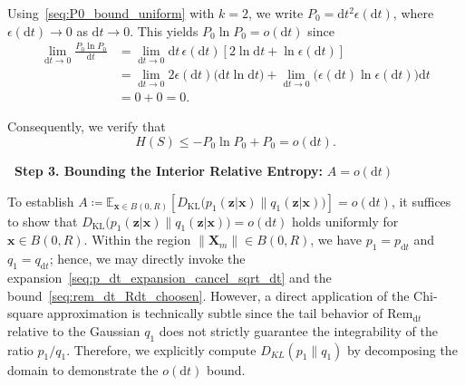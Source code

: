 Using~\eqref{seq:P0_bound_uniform} with $k=2$, we write $P_0=\mathrm dt^2\epsilon(\mathrm dt)$, where $\epsilon(\mathrm dt)\rightarrow0$ as $\mathrm dt\rightarrow 0$.
This yields $P_0\ln P_0=o(\mathrm dt)$ since
\begin{equation}
\begin{aligned}
    \lim_{\mathrm dt\rightarrow 0}
    \frac{P_0\ln P_0}{\mathrm dt}
    &=\lim_{\mathrm dt\rightarrow 0}
    \mathrm dt\,\epsilon(\mathrm dt)
    \left[2\ln\mathrm dt+\ln\epsilon(\mathrm dt)\right]
    \\
    &=\lim_{\mathrm dt\rightarrow 0}
    2\epsilon(\mathrm dt)\big(\mathrm dt\ln\mathrm dt)
    +\lim_{\mathrm dt\rightarrow 0}
    \big(\epsilon(\mathrm dt)\ln\epsilon(\mathrm dt)\big)\mathrm dt
    \\
    &=0+0=0.
    \label{seq:P0lnP0_odt}
\end{aligned}
\end{equation}

Consequently, we verify that
\begin{equation}
    H(S)\leq -P_0\ln P_0+P_0=o(\mathrm dt).
    \label{seq:H(S)_odt}
\end{equation}

\bigskip
\noindent\textbf{\textbullet\ Step 3. Bounding the Interior Relative Entropy:} $A=o(\mathrm dt)$

To establish $A\coloneq\mathbb E_{\bm x\in B(0,R)}\!\left[D_{\mathrm{KL}}\big(p_1(\bm z|\bm x)\|q_1(\bm z|\bm x)\big)\right]=o(\mathrm dt)$, it suffices to show that $D_{\mathrm{KL}}\big(p_1(\bm z|\bm x)\|q_1(\bm z|\bm x)\big)=o(\mathrm dt)$ holds uniformly for $\bm x\in B(0,R)$. Within the region $\|\bm X_m\|\in B(0,R)$, we have $p_1=p_{\mathrm dt}$ and $q_1=q_{\mathrm dt}$; hence, we may directly invoke the expansion~\eqref{seq:p_dt_expansion_cancel_sqrt_dt} and the bound~\eqref{seq:rem_dt_Rdt_choosen}. However, a direct application of the Chi-square approximation is technically subtle since the tail behavior of $\mathrm{Rem}_{\mathrm dt}$ relative to the Gaussian $q_1$ does not strictly guarantee the integrability of the ratio $p_1/q_1$. Therefore, we explicitly compute $D_{KL}(p_1\|q_1)$ by decomposing the domain to demonstrate the $o(\mathrm dt)$ bound.

